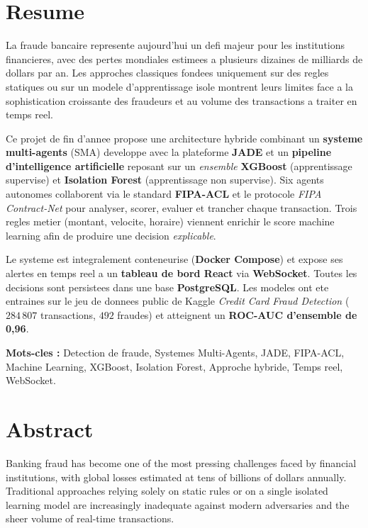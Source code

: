 \documentclass[12pt,a4paper,oneside]{report}
\begin{document}
\chapter*{Resume}

La fraude bancaire represente aujourd'hui un defi majeur pour les institutions
financieres, avec des pertes mondiales estimees a plusieurs dizaines de
milliards de dollars par an. Les approches classiques fondees uniquement sur
des regles statiques ou sur un modele d'apprentissage isole montrent leurs
limites face a la sophistication croissante des fraudeurs et au volume des
transactions a traiter en temps reel.

Ce projet de fin d'annee propose une architecture hybride combinant un
\textbf{systeme multi-agents} (SMA) developpe avec la plateforme \textbf{JADE}
et un \textbf{pipeline d'intelligence artificielle} reposant sur un
\emph{ensemble} \textbf{XGBoost} (apprentissage supervise) et
\textbf{Isolation Forest} (apprentissage non supervise). Six agents autonomes
collaborent via le standard \textbf{FIPA-ACL} et le protocole
\emph{FIPA Contract-Net} pour analyser, scorer, evaluer et trancher chaque
transaction. Trois regles metier (montant, velocite, horaire) viennent enrichir
le score machine learning afin de produire une decision \emph{explicable}.

Le systeme est integralement conteneurise (\textbf{Docker Compose}) et expose
ses alertes en temps reel a un \textbf{tableau de bord React} via
\textbf{WebSocket}. Toutes les decisions sont persistees dans une base
\textbf{PostgreSQL}. Les modeles ont ete entraines sur le jeu de donnees
public de Kaggle \emph{Credit Card Fraud Detection} ($284\,807$ transactions,
$492$ fraudes) et atteignent un \textbf{ROC-AUC d'ensemble de 0,96}.

\noindent\textbf{Mots-cles :} Detection de fraude, Systemes Multi-Agents, JADE,
FIPA-ACL, Machine Learning, XGBoost, Isolation Forest, Approche hybride,
Temps reel, WebSocket.

\chapter*{Abstract}

Banking fraud has become one of the most pressing challenges faced by financial
institutions, with global losses estimated at tens of billions of dollars
annually. Traditional approaches relying solely on static rules or on a single
isolated learning model are increasingly inadequate against modern adversaries
and the sheer volume of real-time transactions.
\end{document}
